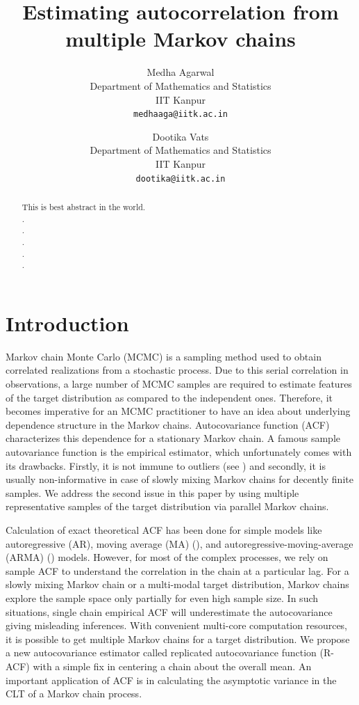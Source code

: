 \documentclass[12pt]{article}
\title{Estimating autocorrelation from multiple Markov chains}
\author{
  Medha Agarwal \\
  Department of Mathematics and Statistics\\
  IIT Kanpur\\
  \texttt{medhaaga@iitk.ac.in} \and
 Dootika Vats \\
  Department of Mathematics and Statistics\\
  IIT Kanpur\\
  \texttt{dootika@iitk.ac.in}
}
\theoremstyle{remark}
\begin{document}
\maketitle


\onehalfspacing
\begin{abstract}
    This is best abstract in the world.\\.\\.\\.\\.\\.
\end{abstract}


\section{Introduction} \label{sec:intro}

Markov chain Monte Carlo (MCMC) is a sampling method used to obtain correlated realizations from a stochastic process. Due to this serial correlation in observations, a large number of MCMC samples are required to estimate features of the target distribution as compared to the independent ones. Therefore, it becomes imperative for an MCMC practitioner to have an idea about underlying dependence structure in the Markov chains. Autocovariance function (ACF) characterizes this dependence for a stationary Markov chain. A famous sample autovariance function is the empirical estimator, which unfortunately comes with its drawbacks. Firstly, it is not immune to outliers (see \cite{ma2000highly}) and secondly, it is usually non-informative in case of slowly mixing Markov chains for decently finite samples. We address the second issue in this paper by using multiple representative samples of the target distribution via parallel Markov chains.

Calculation of exact theoretical ACF has been done for simple models like autoregressive (AR), moving average (MA) (\cite{quenouille1947notes}), and autoregressive-moving-average (ARMA) (\cite{box2015time}) models. However, for most of the complex processes, we rely on sample ACF to understand the correlation in the chain at a particular lag. For a slowly mixing Markov chain or a multi-modal target distribution, Markov chains explore the sample space only partially for even high sample size. In such situations, single chain empirical ACF will underestimate the autocovariance giving misleading inferences. With convenient multi-core computation resources, it is possible to get multiple Markov chains for a target distribution.  We propose a new autocovariance estimator called replicated autocovariance function (R-ACF) with a simple fix in centering a chain about the overall mean. An important application of ACF is in calculating the asymptotic variance in the CLT of a Markov chain process.   
\end{document}
